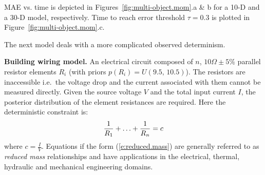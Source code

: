 \documentclass[]{article}
\newcommand{\pr}{p}
\begin{document}
MAE vs. time is depicted in Figures~\ref{fig:multi-object.mom}.a \& b for a 10-D and a 30-D model, respectively.
Time to reach error threshold $\tau = 0.3$ is plotted in 
Figure~\ref{fig:multi-object.mom}.c.


  
%

The next model deals with a more complicated observed determinism.

{\bf Building wiring model. } 
An electrical circuit composed of $n$, $10\Omega\pm5\%$ parallel resistor elements $R_i$
(with priors $\pr(R_i) = U(9.5, \, 10.5)$).
The resistors are inaccessible i.e.\ the voltage drop and the current associated with them cannot be measured directly.
Given the source voltage $V$ and the total input current $I$, the posterior distribution of the element resistances are required.
Here the deterministic constraint is:
\begin{equation} \footnotesize 
\label{e:reduced.mass}
 \frac{1}{R_1} + \ldots + \frac{1}{R_n} = c
\end{equation}
where $c = \frac{I}{V}$.
Equations if the form (\ref{e:reduced.mass}) are generally referred to as \emph{reduced mass} relationships and 
have applications in the electrical, thermal, hydraulic and mechanical engineering domains.
\end{document}
